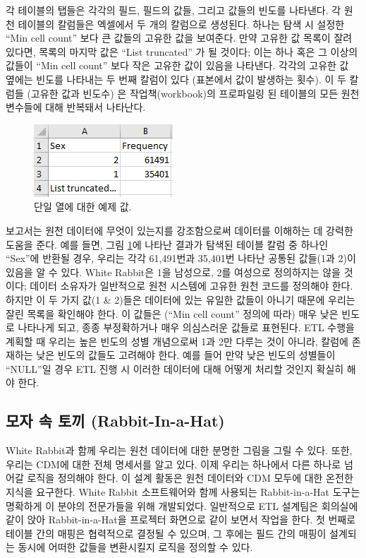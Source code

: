 \documentclass[11pt]{book}
\theoremstyle{definition}
\theoremstyle{definition}
\theoremstyle{definition}
\theoremstyle{remark}
\begin{document}
각 테이블의 탭들은 각각의 필드, 필드의 값들, 그리고 값들의 빈도를
나타낸다. 각 원천 테이블의 칼럼들은 엑셀에서 두 개의 칼럼으로 생성된다.
하나는 탐색 시 설정한 ``Min cell count'' 보다 큰 값들의 고유한 값을
보여준다. 만약 고유한 값 목록이 잘려있다면, 목록의 마지막 값은 ``List
truncated'' 가 될 것이다; 이는 하나 혹은 그 이상의 값들이 ``Min cell
count'' 보다 작은 고유한 값이 있음을 나타낸다. 각각의 고유한 값 옆에는
빈도를 나타내는 두 번째 칼럼이 있다 (표본에서 값이 발생하는 횟수). 이 두
칼럼들 (고유한 값과 빈도수) 은 작업책(workbook)의 프로파일링 된 테이블의
모든 원천 변수들에 대해 반복돼서 나타난다.

\begin{figure}

{\centering \includegraphics[width=0.3\linewidth]{images/ExtractTransformLoad/ScanSex} 

}

\caption{단일 열에 대한 예제 값.}\label{fig:scanSex}
\end{figure}

보고서는 원천 데이터에 무엇이 있는지를 강조함으로써 데이터를 이해하는 데
강력한 도움을 준다. 예를 들면, 그림 \ref{fig:scanSex}에 나타난 결과가
탐색된 테이블 칼럼 중 하나인 ``Sex''에 반환될 경우, 우리는 각각
61,491번과 35,401번 나타난 공통된 값들(1과 2)이 있음을 알 수 있다. White
Rabbit은 1을 남성으로, 2를 여성으로 정의하지는 않을 것이다; 데이터
소유자가 일반적으로 원천 시스템에 고유한 원천 코드를 정의해야 한다.
하지만 이 두 가지 값(1 \& 2)들은 데이터에 있는 유일한 값들이 아니기
때문에 우리는 잘린 목록을 확인해야 한다. 이 값들은 (``Min cell count''
정의에 따라) 매우 낮은 빈도로 나타나게 되고, 종종 부정확하거나 매우
의심스러운 값들로 표현된다. ETL 수행을 계획할 때 우리는 높은 빈도의 성별
개념으로써 1과 2만 다루는 것이 아니라, 칼럼에 존재하는 낮은 빈도의
값들도 고려해야 한다. 예를 들어 만약 낮은 빈도의 성별들이 ``NULL''일
경우 ETL 진행 시 이러한 데이터에 대해 어떻게 처리할 것인지 확실히 해야
한다.

\subsection{모자 속 토끼 (Rabbit-In-a-Hat)}\label{---rabbit-in-a-hat}

White Rabbit과 함께 우리는 원천 데이터에 대한 분명한 그림을 그릴 수
있다. 또한, 우리는 CDM에 대한 전체 명세서를 알고 있다. 이제 우리는
하나에서 다른 하나로 넘어갈 로직을 정의해야 한다. 이 설계 활동은 원천
데이터와 CDM 모두에 대한 온전한 지식을 요구한다. White Rabbit
소프트웨어와 함께 사용되는 Rabbit-in-a-Hat 도구는 명확하게 이 분야의
전문가들을 위해 개발되었다. 일반적으로 ETL 설계팀은 회의실에 같이 앉아
Rabbit-in-a-Hat을 프로젝터 화면으로 같이 보면서 작업을 한다. 첫 번째로
테이블 간의 매핑은 협력적으로 결정될 수 있으며, 그 후에는 필드 간의
매핑이 설계되는 동시에 어떠한 값들을 변환시킬지 로직을 정의할 수 있다.
 
\end{document}
